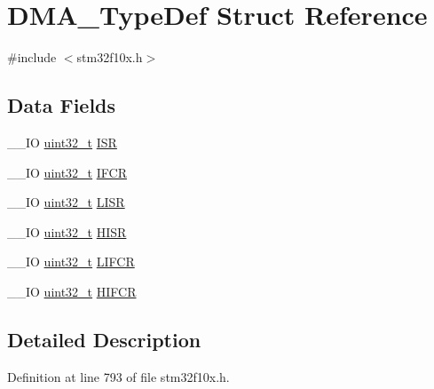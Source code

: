 \hypertarget{struct_d_m_a___type_def}{\section{D\-M\-A\-\_\-\-Type\-Def Struct Reference}
\label{struct_d_m_a___type_def}
}


{\ttfamily \#include $<$stm32f10x.\-h$>$}

\subsection*{Data Fields}
\begin{DoxyCompactItemize}
\item 
\-\_\-\-\_\-\-I\-O \hyperlink{stdint_8h_a435d1572bf3f880d55459d9805097f62}{uint32\-\_\-t} \hyperlink{struct_d_m_a___type_def_aa341a859df2f59bf6c0f7a000ab8734b}{I\-S\-R}
\item 
\-\_\-\-\_\-\-I\-O \hyperlink{stdint_8h_a435d1572bf3f880d55459d9805097f62}{uint32\-\_\-t} \hyperlink{struct_d_m_a___type_def_a30576220ca1968e61666d92092e8911e}{I\-F\-C\-R}
\item 
\-\_\-\-\_\-\-I\-O \hyperlink{stdint_8h_a435d1572bf3f880d55459d9805097f62}{uint32\-\_\-t} \hyperlink{struct_d_m_a___type_def_aacb4a0977d281bc809cb5974e178bc2b}{L\-I\-S\-R}
\item 
\-\_\-\-\_\-\-I\-O \hyperlink{stdint_8h_a435d1572bf3f880d55459d9805097f62}{uint32\-\_\-t} \hyperlink{struct_d_m_a___type_def_a01a90a5fcd6459e10b81c0ab737dd2e3}{H\-I\-S\-R}
\item 
\-\_\-\-\_\-\-I\-O \hyperlink{stdint_8h_a435d1572bf3f880d55459d9805097f62}{uint32\-\_\-t} \hyperlink{struct_d_m_a___type_def_a11adb689c874d38b49fa44990323b653}{L\-I\-F\-C\-R}
\item 
\-\_\-\-\_\-\-I\-O \hyperlink{stdint_8h_a435d1572bf3f880d55459d9805097f62}{uint32\-\_\-t} \hyperlink{struct_d_m_a___type_def_a1e4f50b935bab2520788ae936f2e55c1}{H\-I\-F\-C\-R}
\end{DoxyCompactItemize}


\subsection{Detailed Description}


Definition at line 793 of file stm32f10x.\-h.



